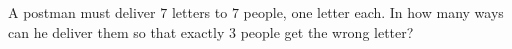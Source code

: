 A postman must deliver $7$ letters to $7$ people, one letter each. In how many ways can he deliver them so that exactly $3$ people get the wrong letter?
